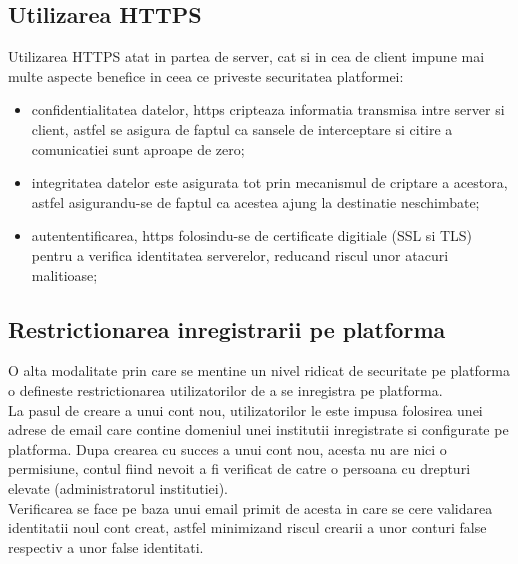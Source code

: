 \subsection*{Utilizarea HTTPS}

Utilizarea HTTPS atat in partea de server, cat si in cea de client impune mai multe aspecte benefice in ceea ce priveste securitatea platformei:

\begin{itemize}
	
	\item confidentialitatea datelor, https cripteaza informatia transmisa intre server si client, astfel se asigura de faptul ca sansele de interceptare si citire a  comunicatiei sunt aproape de zero;
	
	\item integritatea datelor este asigurata tot prin mecanismul de criptare a acestora, astfel asigurandu-se de faptul ca acestea ajung la destinatie neschimbate;
	
	\item autententificarea, https folosindu-se de certificate digitiale (SSL si TLS) pentru a verifica identitatea serverelor, reducand riscul unor atacuri malitioase; 
	
\end{itemize}


\subsection*{Restrictionarea inregistrarii pe platforma}

O alta modalitate prin care se mentine un nivel ridicat de securitate pe platforma o defineste restrictionarea utilizatorilor de a se inregistra pe platforma.\\
La pasul de creare a unui cont nou, utilizatorilor le este  impusa folosirea unei adrese de email care contine domeniul unei institutii inregistrate si configurate pe platforma. Dupa crearea cu succes a unui cont nou, acesta nu are nici o permisiune, contul fiind nevoit a fi verificat de catre o persoana cu drepturi elevate (administratorul institutiei).\\ 
Verificarea se face pe baza unui email primit de acesta in care se cere validarea identitatii noul cont creat, astfel minimizand riscul crearii a unor conturi false respectiv a unor false identitati.

\newpage

